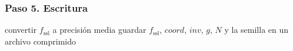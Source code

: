 \subsubsection*{Paso 5. Escritura}

\begin{algorithm}[H]
\small
\caption{Paso 5 del Módulo~3, escritura.}
convertir $f_{\mathrm{ssl}}$ a precisión media\;
guardar $f_{\mathrm{ssl}}$, $\mathit{coord}$, $\mathit{inv}$, $g$, $N$ y la semilla en un archivo comprimido\;
\end{algorithm}

